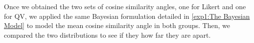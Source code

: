 Once we obtained the two sets of cosine similarity angles, one for Likert and one for QV, we applied the same Bayesian formulation detailed in \cref{exp1:The Bayesian Model} to model the mean cosine similarity angle in both groups. Then, we compared the two distributions to see if they how far they are apart.